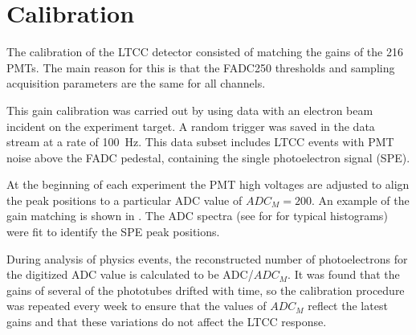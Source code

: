 \section{Calibration}

The calibration of the LTCC detector consisted of matching the gains of the 216 PMTs. The main reason for this
is that the FADC250 thresholds and sampling acquisition parameters are the same for all channels.

This gain calibration was carried out by using data with an electron beam incident on the experiment target. A
random trigger was saved in the data stream at a rate of 100~Hz. This data subset includes LTCC events with
PMT noise above the FADC pedestal, containing the single photoelectron signal (SPE).

At the beginning of each experiment the PMT high voltages are adjusted to align the peak positions to a particular
ADC value of $ADC_M = 200$. An example of the gain matching is shown in . The ADC spectra
(see for  for typical histograms) were fit to identify the SPE peak positions.

During analysis of physics events, the reconstructed number of photoelectrons for the digitized ADC value is
calculated to be ADC/$ADC_M$. It was found that the gains of several of the phototubes drifted with time, so
the calibration procedure was repeated every week to ensure that the values of $ADC_M$ reflect the latest
gains and that these variations do not affect the LTCC response.

